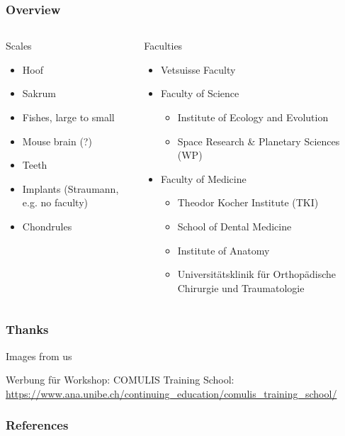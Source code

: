 \documentclass[aspectratio=169]{beamer}
\begin{document}
\begin{frame}
	\frametitle{Overview}
	\begin{columns}
		\begin{column}{0.309\linewidth}
			Scales
			\begin{itemize}
				\item Hoof
				\item Sakrum
				\item Fishes, large to small	
				\item Mouse brain (?)
				\item Teeth
				\item Implants (Straumann, e.g. no faculty)
				\item Chondrules
			\end{itemize}
		\end{column}
		\begin{column}{0.618\linewidth}
			Faculties
			\begin{itemize}
				\item Vetsuisse Faculty
				\item Faculty of Science
				\begin{itemize}
					\item Institute of Ecology and Evolution
					\item Space Research \& Planetary Sciences (WP)
				\end{itemize}	
				\item Faculty of Medicine
				\begin{itemize}
					\item Theodor Kocher Institute (TKI)
					\item School of Dental Medicine
					\item Institute of Anatomy
					\item Universitätsklinik für Orthopädische Chirurgie und Traumatologie
				\end{itemize}
			\end{itemize}
		\end{column}
	\end{columns}
\end{frame}

\begin{frame}
	\frametitle{Thanks}
	Images from us
	
	Werbung für Workshop: COMULIS Training School: \url{https://www.ana.unibe.ch/continuing_education/comulis_training_school/}
\end{frame}

\begin{frame}
	\frametitle{References}
	\printbibliography
\end{frame}
\end{document}
